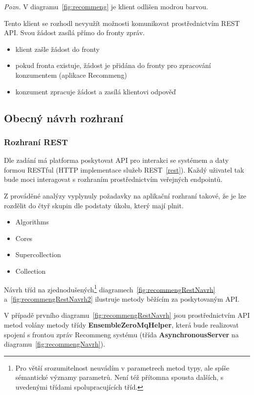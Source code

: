 \documentclass[thesis=M,czech]{FITthesis}[2014/05/07]
\begin{document}
\emph{Pozn.} V diagramu~\ref{fig:recommeng} je klient odlišen modrou barvou.

Tento klient se rozhodl nevyužít možnosti komunikovat prostřednictvím REST API. Svou žádost zasílá přímo do fronty zpráv.

\begin{itemize}
	\item klient zašle žádost do fronty
	\item pokud fronta existuje, žádost je přidána do fronty pro zpracování konzumentem (aplikace Recommeng)
	\item konzument zpracuje žádost a zasílá klientovi odpověď
\end{itemize}

\subsection{Obecný návrh rozhraní}
\label{sec:recommeng}

\subsubsection{Rozhraní REST}
Dle zadání má platforma poskytovat API pro interakci se systémem a daty formou RESTful (HTTP implementace služeb REST~\ref{rest}). Každý uživatel tak bude moci interagovat s rozhraním prostřednictvím veřejných endpointů.

Z prováděné analýzy vyplynuly požadavky na aplikační rozhraní takové, že je lze rozdělit do čtyř skupin dle podstaty úkolu, který mají plnit. 

\begin{itemize}
	\item Algorithms
	\item Cores
	\item Supercollection
	\item Collection	
\end{itemize}

Návrh tříd na zjednodušených\footnote{Pro větší srozumitelnost neuvádím v parametrech metod typy, ale spíše sémantické významy parametrů. Není též přítomna spousta dalších, s uvedenými třídami spolupracujících tříd.} diagramech~\ref{fig:recommengRestNavrh} a~\ref{fig:recommengRestNavrh2} ilustruje metody běžícím za poskytovaným API.

V případě prvního diagramu~\ref{fig:recommengRestNavrh} jsou prostřednictvím API metod volány metody třídy \textbf{EnsembleZeroMqHelper}, která bude realizovat spojení s frontou zpráv Recommeng systému (třída \textbf{AsynchronousServer} na diagramu~\ref{fig:recommengNavrh}).
\end{document}
